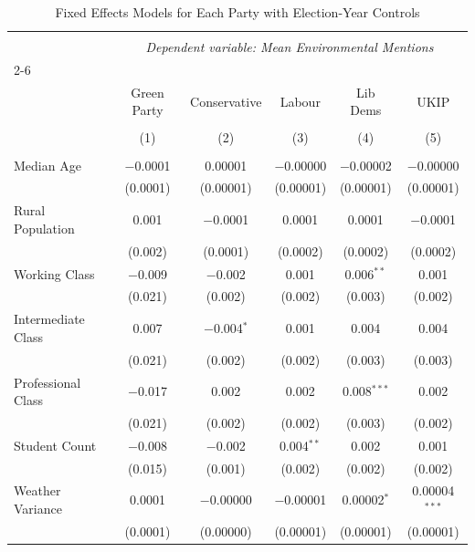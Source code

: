 \documentclass[preprint,12pt,authoryear]{elsarticle}
\begin{document}
\begin{table}[!htbp] \centering
	\caption{Fixed Effects Models for Each Party with Election-Year Controls}
	\label{tab:party_fixed_effects}
	\scriptsize %
	\setlength{\tabcolsep}{6pt} %
	\renewcommand{\arraystretch}{1.2} %
\begin{tabular}{@{\extracolsep{6pt}}lccccc}
\\[-1.8ex]\hline
\hline \\[-1.8ex]
 & \multicolumn{5}{c}{\textit{Dependent variable: Mean Environmental Mentions}} \\
\cline{2-6} 
\\[-1.8ex] & Green Party & Conservative & Labour & Lib Dems & UKIP \\      
\\[-1.8ex] & (1) & (2) & (3) & (4) & (5)\\
\hline \\[-1.8ex]
Median Age & $-$0.0001 & 0.00001 & $-$0.00000 & $-$0.00002 & $-$0.00000 \\ 
	& (0.0001) & (0.00001) & (0.00001) & (0.00001) & (0.00001) \\
Rural Population & 0.001 & $-$0.0001 & 0.0001 & 0.0001 & $-$0.0001 \\
	& (0.002) & (0.0001) & (0.0002) & (0.0002) & (0.0002) \\
Working Class & $-$0.009 & $-$0.002 & 0.001 & 0.006$^{**}$ & 0.001 \\
	& (0.021) & (0.002) & (0.002) & (0.003) & (0.002) \\ 
Intermediate Class & 0.007 & $-$0.004$^{*}$ & 0.001 & 0.004 & 0.004 \\
	& (0.021) & (0.002) & (0.002) & (0.003) & (0.003) \\
Professional Class & $-$0.017 & 0.002 & 0.002 & 0.008$^{***}$ & 0.002 \\ 
	& (0.021) & (0.002) & (0.002) & (0.003) & (0.002) \\
Student Count & $-$0.008 & $-$0.002 & 0.004$^{**}$ & 0.002 & 0.001 \\
	& (0.015) & (0.001) & (0.002) & (0.002) & (0.002) \\
Weather Variance & 0.0001 & $-$0.00000 & $-$0.00001 & 0.00002$^{*}$ & 0.00004$^{***}$ \\ 
	& (0.0001) & (0.00000) & (0.00001) & (0.00001) & (0.00001) \\

\end{tabular}
\end{table}
\end{document}
